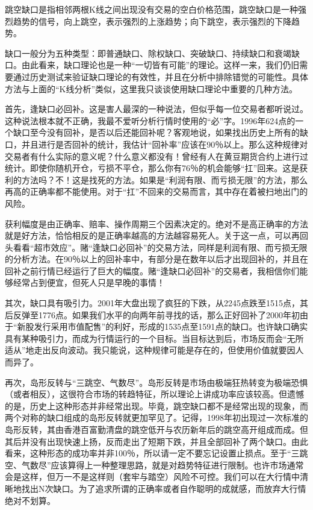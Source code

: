跳空缺口是指相邻两根K线之间出现没有交易的空白价格范围，跳空缺口是一种强烈趋势的信号，向上跳空，表示强烈的上涨趋势；向下跳空，表示强烈的下降趋势。

缺口一般分为五种类型：即普通缺口、除权缺口、突破缺口、持续缺口和衰竭缺口。由此看来，缺口理论也是一种“一切皆有可能”的理论。这样一来，我们仍旧需要通过历史测试来验证缺口理论的有效性，并且在分析中排除错觉的可能性。具体方法与上面的“K线分析”类似，这里我只谈谈使用缺口理论中重要的几种方法。

首先，逢缺口必回补。这是害人最深的一种说法，但似乎每一位交易者都听说过。这种说法根本就不正确，我最不爱听分析行情时使用的“必”字。1996年624点的一个缺口至今没有回补，是否以后还能回补呢？客观地说，如果找出历史上所有的缺口，并且进行是否回补的统计，我估计“回补率”应该在90％以上。那么这种规律对交易者有什么实际的意义呢？什么意义都没有！曾经有人在黄豆期货合约上进行过统计。即使你随机开仓，亏损不平仓，那么你有76％的机会能够“扛”回来。这是获利的方法吗？不！这是找死的方法。如果是“利润有限、而亏损无限”的方法，那么再高的正确率都不能使用。对于“扛”不回来的交易而言，其中存在着被扫地出门的风险。

获利幅度是由正确率、赔率、操作周期三个因素决定的。绝对不是高正确率的方法就是好方法，恰恰相反的是正确率越高的方法越容易死人。关于这一点，可以再回头看看“超市效应”。赌“逢缺口必回补”的交易方法，同样是利润有限、而亏损无限的分析方法。在90％以上的回补率中，有部分是在数年以后才出现回补的，并且在回补之前行情已经运行了巨大的幅度。赌“逢缺口必回补”的交易者，我相信你们能够经常占到便宜，但死人只是早晚的事情！

其次，缺口具有吸引力。2001年大盘出现了疯狂的下跌，从2245点跌至1515点，其后反弹至1776点。如果我们水平的向两年前寻找的话，那么正好回补了2000年初由于“新股发行采用市值配售”的利好，形成的1535点至1591点的缺口。也许缺口确实具有某种吸引力，而成为行情运行的一个目标。当目标达到后，市场反而会“无所适从”地走出反向波动。我只能说，这种规律可能是存在的，但使用价值就要因人而异了。

再次，岛形反转与“三跳空、气数尽”。岛形反转是市场由极端狂热转变为极端恐惧（或者相反），这很符合市场的转趋特征，所以理论上讲成功率应该较高。但遗憾的是，历史上这种形态并非经常出现。毕竟，跳空缺口都不是经常出现的现象，而两个对称的缺口组成的岛形反转就更加罕见了。记得，1998年初出现过一次标准的岛形反转，其由香港百富勤清盘的跳空低开与农历新年后的跳空高开组成而成。但其后并没有出现快速上扬，反而走出了短期下跌，并且全部回补了两个缺口。由此看来，这种形态的成功率并非100％，所以请一定不要忘记设置止损点。至于“三跳空、气数尽”应该算得上一种整理思路，就是对趋势特征进行限制。也许市场通常会是这样，但万一不是这样则（套牢与踏空）风险不可控。我们可以在大行情中清晰地找出N次缺口。为了追求所谓的正确率或者自作聪明的成就感，而放弃大行情绝对不划算。

